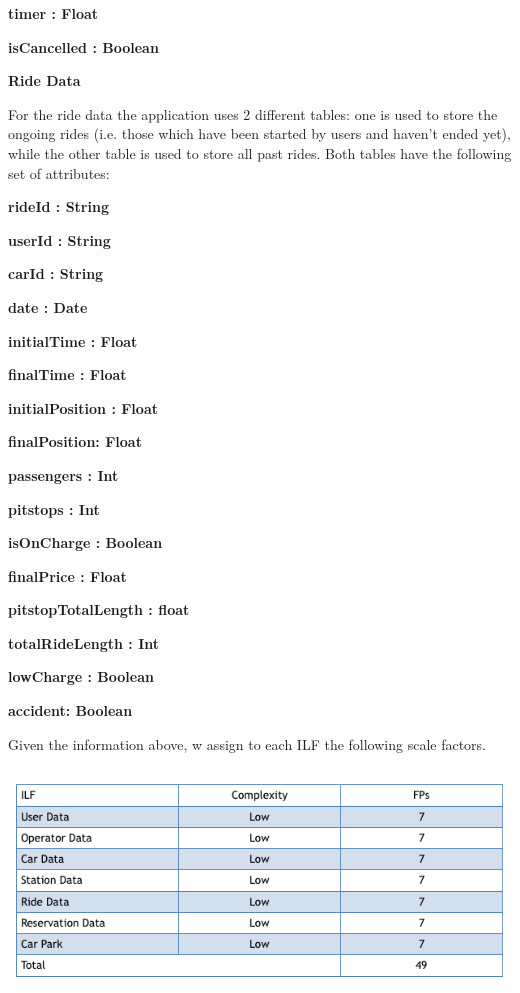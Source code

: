 \documentclass{article}
\begin{document}
\begin{flushleft}
\begin{description}
\item \textbf{timer : Float } 
\item \textbf{isCancelled : Boolean } 

\end{description}


\vspace{0.5cm}



\textbf{Ride Data} \break

For the ride data the application uses 2 different tables: one is used to store the ongoing rides (i.e. those which have been started by users and haven't ended yet), while the other table is used to store all past rides.
 Both tables have the following set of attributes:\\
 \begin{description}
\item \textbf{rideId : String} 
\item \textbf{userId : String}     
\item \textbf{carId : String} 
\item \textbf{date : Date } 
\item \textbf{initialTime : Float } 
\item \textbf{finalTime : Float } 
\item \textbf{initialPosition : Float } 
\item \textbf{finalPosition: Float } 
\item \textbf{passengers : Int } 
\item \textbf{pitstops : Int } 
\item \textbf{isOnCharge : Boolean } 
\item \textbf{finalPrice : Float }
\item \textbf{pitstopTotalLength : float}  
\item \textbf{totalRideLength : Int } 
\item \textbf{lowCharge : Boolean } 
\item \textbf{accident: Boolean } 

\end{description}

Given the information above, w assign to each ILF the following scale factors. 

\vspace{0.5cm}

\includegraphics[scale=0.5]{ILF}



\end{flushleft}
\end{document}
